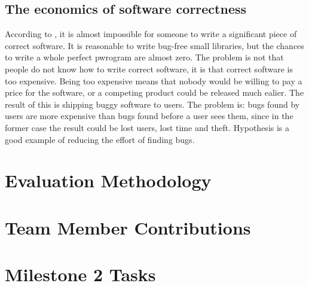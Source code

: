 \documentclass[preprint,nocopyrightspace]{sig-alternate}
\begin{document}
\subsection{The economics of software correctness}
According to \citet{maciver_economics_2015}, it is almost impossible for someone to write a significant piece of correct software. It is reasonable to write bug-free small libraries, but the chances to write a whole perfect pwrogram are almost zero. The problem is not that people do not know how to write correct software, it is that correct software is too expensive. Being too expensive means that nobody would be willing to pay a price for the software, or a competing product could be released much ealier. The result of this is shipping buggy software to users. The problem is: bugs found by users are more expensive than bugs found before a user sees them, since in the former case the result could be lost users, lost time and theft. Hypothesis is a good example of reducing the effort of finding bugs.

\section{Evaluation Methodology}

\section{Team Member Contributions}

\section{Milestone 2 Tasks}


\end{document}
